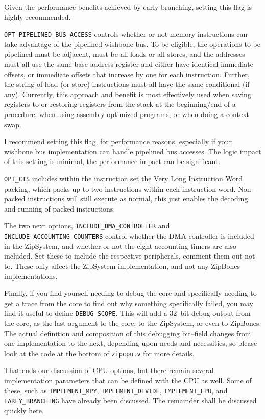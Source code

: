 \documentclass{gqtekspec}
\begin{document}
Given the performance benefits achieved by early branching, setting this flag
is highly recommended.

{\tt OPT\_PIPELINED\_BUS\_ACCESS} controls whether or not memory
instructions can take advantage of the pipelined wishbone bus.  To be
eligible, the operations to be pipelined must be adjacent, must be all
loads or all stores, and the addresses must all use the same base
address register and either have identical immediate offsets, or immediate
offsets that increase by one for each instruction.  Further, the
string of load (or store) instructions must all have the same conditional
(if any).  Currently, this approach and benefit is most effectively used
when saving registers to or restoring registers from the stack at the
beginning/end of a procedure, when using assembly optimized programs, or
when doing a context swap.

I recommend setting this flag, for performance reasons, especially if your
wishbone bus implementation can handle pipelined bus accesses.  The logic
impact of this setting is minimal, the performance impact can be significant.

{\tt OPT\_CIS} includes within the instruction set the Very Long Instruction
Word packing, which packs up to two instructions within each instruction word.
Non--packed instructions will still execute as normal, this just enables the
decoding and running of packed instructions.

The two next options, {\tt INCLUDE\_DMA\_CONTROLLER} and
{\tt INCLUDE\_ACCOUNTING\_COUNTERS}
control whether the DMA controller is included in the ZipSystem, and
whether or not the eight accounting timers are also included.  Set these to
include the respective peripherals, comment them out not to.  These only 
affect the ZipSystem implementation, and not any ZipBones implementations.

Finally, if you find yourself needing to debug the core and specifically
needing to get a trace from the core to find out why something specifically
failed, you may find it useful to define {\tt DEBUG\_SCOPE}.  This will add a
32--bit debug output from the core, as the last argument to the core, to the
ZipSystem, or even to ZipBones.  The actual definition and composition of
this debugging bit--field changes from one implementation to the next,
depending upon needs and necessities, so please look at the code at the
bottom of {\tt zipcpu.v} for more details.

That ends our discussion of CPU options, but there remain several
implementation parameters that can be defined with the CPU as well.  Some of
these, such as {\tt IMPLEMENT\_MPY}, {\tt IMPLEMENT\_DIVIDE},
{\tt IMPLEMENT\_FPU}, and {\tt EARLY\_BRANCHING} have already been discussed.
The remainder shall be discussed quickly here.
\end{document}
